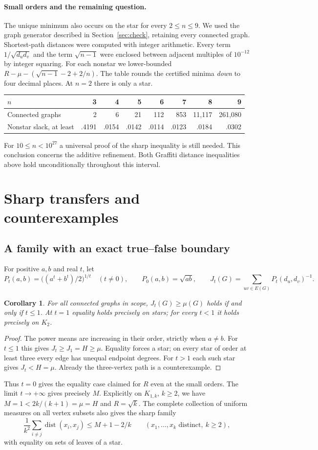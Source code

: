 \documentclass[11pt,a4paper]{article}
\newtheorem{corollary}[theorem]{Corollary}
\theoremstyle{remark}\newtheorem*{remark}{Remark}
\DeclareMathOperator{\dist}{dist}
\begin{document}
\paragraph{Small orders and the remaining question.}
The unique minimum also occurs on the star for every $2\le n\le9$. We used the graph generator described in Section~\ref{sec:check}, retaining every connected graph. Shortest-path distances were computed with integer arithmetic. Every term $1/\sqrt{d_ud_v}$ and the term $\sqrt{n-1}$ were enclosed between adjacent multiples of $10^{-12}$ by integer squaring. For each nonstar we lower-bounded $R-\mu-(\sqrt{n-1}-2+2/n)$. The table rounds the certified minima \emph{down} to four decimal places. At $n=2$ there is only a star.
\begin{center}\small
\begin{tabular}{@{}lrrrrrrr@{}}\toprule
$n$ &3&4&5&6&7&8&9\\\midrule
Connected graphs &2&6&21&112&853&11,117&261,080\\
Nonstar slack, at least &.4191&.0154&.0142&.0114&.0123&.0184&.0302\\\bottomrule
\end{tabular}
\end{center}
For $10\le n<10^{27}$ a universal proof of the sharp inequality is still needed. This conclusion concerns the additive refinement. Both Graffiti distance inequalities above hold unconditionally throughout this interval.


\section{Sharp transfers and counterexamples}\label{sec:limits}
\subsection{A family with an exact true--false boundary}
For positive $a,b$ and real $t$, let
\[
 P_t(a,b)=\bigl((a^t+b^t)/2\bigr)^{1/t}\quad(t\ne0),
 \qquad P_0(a,b)=\sqrt{ab},\qquad
 J_t(G)=\sum_{uv\in E(G)}P_t(d_u,d_v)^{-1}.
\]
\begin{corollary}
For all connected graphs in scope, $J_t(G)\ge\mu(G)$ holds if and only if $t\le1$. At $t=1$ equality holds precisely on stars; for every $t<1$ it holds precisely on $K_2$.
\end{corollary}
\begin{proof}
The power means are increasing in their order, strictly when $a\ne b$. For $t\le1$ this gives $J_t\ge J_1=H\ge\mu$. Equality forces a star; on every star of order at least three every edge has unequal endpoint degrees. For $t>1$ each such star gives $J_t<H=\mu$. Already the three-vertex path is a counterexample.
\end{proof}
Thus $t=0$ gives the equality case claimed for $R$ even at the small orders. The limit $t\to+\infty$ gives precisely $M$. Explicitly on $K_{1,k}$, $k\ge2$, we have $M=1<2k/(k+1)=\mu=H$ and $R=\sqrt{k}$. The complete collection of uniform measures on all vertex subsets also gives the sharp family
\[
 \frac1{k^2}\sum_{i\ne j}\dist(x_i,x_j)\le M+1-2/k
 \qquad (x_1,\ldots,x_k\text{ distinct},\ k\ge2),
\]
with equality on sets of leaves of a star.
\end{document}
